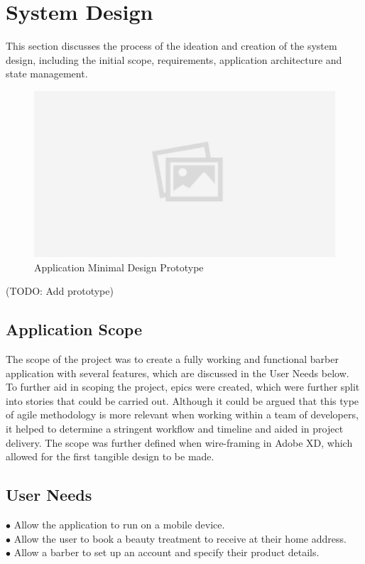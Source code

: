 \documentclass[12pt]{article}
\begin{document}
		

	\section{System Design}
	This section discusses the process of the ideation and creation of the system design, including the initial scope, requirements, application architecture and state management.
	\begin{figure}[H]
		\centering
 		\includegraphics[scale=0.2]{images/placeholder.jpg}
		\caption{Application Minimal Design Prototype}
		\label{fig:minimal-prototype}
	\end{figure}

	(TODO: Add prototype)

	\subsection{Application Scope}
	The scope of the project was to create a fully working and functional barber application with several features, which are discussed in the User Needs below. To further aid in scoping the project, epics were created, which were further split into stories that could be carried out. Although it could be argued that this type of agile methodology is more relevant when working within a team of developers, it helped to determine a stringent workflow and timeline and aided in project delivery.
	The scope was further defined when wire-framing in Adobe XD, which allowed for the first tangible design to be made.
	
	\subsection{User Needs}
	$\bullet$ Allow the application to run on a mobile device.
	\\
	$\bullet$ Allow the user to book a beauty treatment to receive at their home address.
	\\
	$\bullet$ Allow a barber to set up an account and specify their product details.
\end{document}
